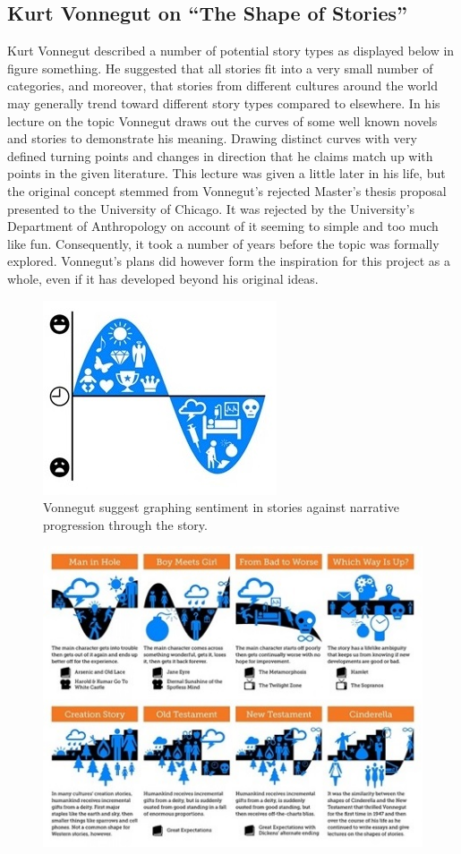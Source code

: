 \documentclass{article}
\begin{document}
{    \subsection{Kurt Vonnegut on ``The Shape of Stories''}
        Kurt Vonnegut described a number of potential story types as displayed below in figure something. He suggested that all stories fit into a very small number of categories, and moreover, that stories from different cultures around the world may generally trend toward different story types compared to elsewhere. In his lecture on the topic \citep{vonnegutLecture} Vonnegut draws out the curves of some well known novels and stories to demonstrate his meaning. Drawing distinct curves with very defined turning points and changes in direction that he claims match up with points in the given literature. This lecture was given a little later in his life, but the original concept stemmed from Vonnegut's rejected Master's thesis proposal presented to the University of Chicago. It was rejected by the University's Department of Anthropology on account of it seeming to simple and too much like fun. Consequently, it took a number of years before the topic was formally explored. Vonnegut's plans did however form the inspiration for this project as a whole, even if it has developed beyond his original ideas.
        \begin{figure}[htbp]
            \centering
            \includegraphics{Figures/Misc/sentimentGraph}
            \caption{Vonnegut suggest graphing sentiment in stories against narrative progression through the story.}
            \label{fig:sentiGraph}
        \end{figure}
        \begin{figure}[htbp]
            \centering
            \includegraphics{Figures/Misc/VonnegutShapes}

\end{figure}}
\end{document}
